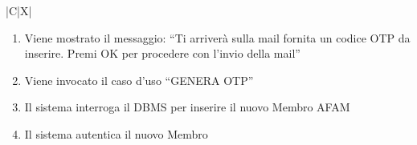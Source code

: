 \begin{tabularx}{\textwidth}{|C|X|}
{\begin{enumerate}
\begin{enumerate}
        \begin{enumerate}
            \item Il sistema mostra a video l'errore: ``Errore: Formato della password non corretto!'', specificando i requisiti del formato corretto
            \item Il Membro ricompila i campi
            \item Il Membro preme il pulsante ``REGISTRATI''
        \end{enumerate}
        \item \textbf{ALTRIMENTI SE} il campo della password non \`e uguale al suo campo di verifica:
        \begin{enumerate}
            \item Il sistema mostra a video l'errore: ``Errore: I campi della password devono essere uguali!''
            \item Il Membro ricompila i campi
            \item Il Membro preme il pulsante ``REGISTRATI''
        \end{enumerate}
        \item \textbf{ALTRIMENTI}:
        \begin{enumerate}
            \item Il sistema interroga il DBMS per verificare l'esistenza della mail inserita
            \item \textbf{SE} la mail inserita \`e gi\`a in uso:
            \begin{enumerate}
                \item Il sistema mostra a video l'errore: ``Errore: email gi\`a in uso! Scegline un'altra!''
                \item Il Membro ricompila i campi
                \item Il Membro preme il pulsante ``REGISTRATI''
            \end{enumerate}
        \end{enumerate}
        \item Il sistema controlla i valori inseriti
    \end{enumerate}
    \item Viene mostrato il messaggio: ``Ti arriver\`a sulla mail fornita un codice OTP da inserire. Premi OK per procedere con l'invio della mail''
    \item Viene invocato il caso d'uso ``GENERA OTP''
    \item Il sistema interroga il DBMS per inserire il nuovo Membro AFAM
    \item Il sistema autentica il nuovo Membro

\end{enumerate}}
\end{tabularx}
